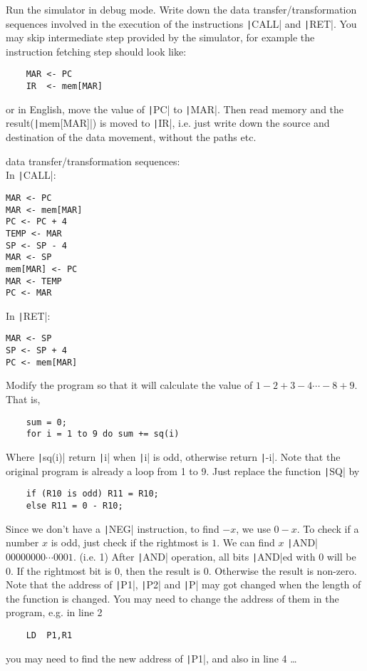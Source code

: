 \documentclass[answers]{exam}
\begin{document}
\begin{questions}
    \question Run the simulator in debug mode. Write down the data transfer/transformation sequences involved in the execution of the instructions \texttt|CALL| and \texttt|RET|.
    You may skip intermediate step provided by the simulator, for example the instruction fetching step should look like:
    \begin{verbatim}
    MAR <- PC
    IR  <- mem[MAR]
    \end{verbatim}
    or in English, move the value of \texttt|PC| to \texttt|MAR|. Then read memory and the result(\texttt|mem[MAR]|) is moved to \texttt|IR|, i.e. just write down the source and destination of the data movement, without the paths etc.

    \begin{solution}
        data transfer/transformation sequences: \\
        In \texttt|CALL|:
        \begin{verbatim}
MAR <- PC
MAR <- mem[MAR]
PC <- PC + 4
TEMP <- MAR
SP <- SP - 4
MAR <- SP
mem[MAR] <- PC
MAR <- TEMP
PC <- MAR        
        \end{verbatim}
        In \texttt|RET|:
        \begin{verbatim}
MAR <- SP
SP <- SP + 4
PC <- mem[MAR]     
        \end{verbatim}
    \end{solution}

    \pagebreak
    \question Modify the program so that it will calculate the value of $1 - 2 + 3 - 4 \cdots - 8 + 9$.
    That is,
    \begin{verbatim}
    sum = 0;
    for i = 1 to 9 do sum += sq(i)
    \end{verbatim}
    Where \texttt|sq(i)| return \texttt|i| when \texttt|i| is odd, otherwise return \texttt|-i|.
    Note that the original program is already a loop from 1 to 9. Just replace the function \texttt|SQ| by
    \begin{verbatim}
    if (R10 is odd) R11 = R10;
    else R11 = 0 - R10;
    \end{verbatim}
    Since we don't have a \texttt|NEG| instruction, to find $-x$, we use $0 - x$.
    To check if a number $x$ is odd, just check if the rightmost is $1$. We can find $x$ \texttt|AND| $00000000 \cdots 0001$. (i.e. 1) After \texttt|AND| operation, all bits \texttt|AND|ed with 0 will be 0. If the rightmost bit is 0, then the result is 0. Otherwise the result is non-zero.
    Note that the address of \texttt|P1|, \texttt|P2| and \texttt|P| may got changed when the length of the function is changed. You may need to change the address of them in the program, e.g. in line 2
    \begin{verbatim}
    LD  P1,R1
    \end{verbatim}
    you may need to find the new address of \texttt|P1|, and also in line 4 \dots


\end{questions}
\end{document}
